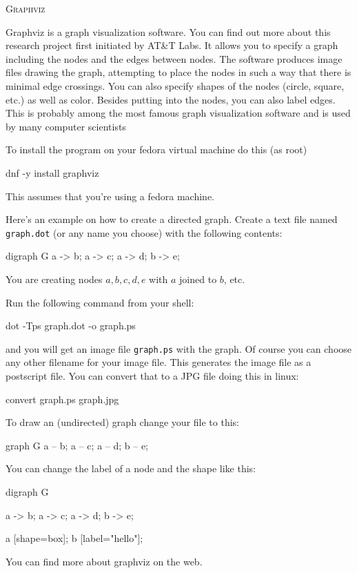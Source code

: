 \textsc{Graphviz}

Graphviz is a graph visualization software.
You can find out more about this research
project first initiated by AT\&T Labs.
It allows you to specify a graph including
the nodes 
and the edges between nodes.
The software produces image files drawing
the graph, attempting to place the nodes
in such a way that there is minimal edge crossings.
You can also specify shapes of the nodes (circle, square, etc.)
as well as color.
Besides putting into the nodes, you can also label edges.
This is probably among the most famous graph visualization software
and is used by many computer scientists

To install the program on your fedora virtual machine do this
(as root)
\begin{console}[fontsize=\footnotesize]
dnf -y install graphviz
\end{console}
This assumes that you're using a fedora machine.

Here's an example on how to create a directed graph.
Create a text file named \verb!graph.dot! (or any name you choose)
with the following contents:
\begin{console}[fontsize=\footnotesize]
digraph G
{
   a -> b;
   a -> c;
   a -> d;
   b -> e;
}
\end{console}
You are creating nodes $a, b, c, d, e$ with $a$ joined to $b$, etc.

Run the following command from your shell:
\begin{console}[fontsize=\footnotesize]
dot -Tps graph.dot -o graph.ps
\end{console}
and you will get an image file \verb!graph.ps! with the graph.
Of course you can choose any other filename for your image file. 
This generates the image file as a postscript file.
You can convert that to a JPG file doing this in linux:
\begin{console}
convert graph.ps graph.jpg
\end{console}
To draw an (undirected)  graph change your file to this:
\begin{console}[fontsize=\footnotesize]
graph G
{
   a -- b;
   a -- c;
   a -- d;
   b -- e;
}
\end{console}

You can change the label of a node and the shape like this:
\begin{console}[fontsize=\footnotesize]
digraph G
{
   a -> b;
   a -> c;
   a -> d;
   b -> e;

   a [shape=box];
   b [label="hello\nworld"];
}
\end{console}

You can find more about graphviz on the web.
